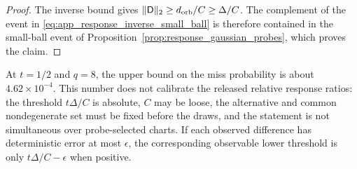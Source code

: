 \begin{proof}
The inverse bound gives $\|\mathsf D\|_2\ge d_{\rm orb}/C\ge\Delta/C$.
The complement of the event in
\eqref{eq:app_response_inverse_small_ball} is therefore contained in the
small-ball event of Proposition~\ref{prop:response_gaussian_probes}, which
proves the claim.
\end{proof}

At $t=1/2$ and $q=8$, the upper bound on the miss probability is about
$4.62\times10^{-4}$.  This number does not calibrate the released relative
response ratios: the threshold $t\Delta/C$ is absolute, $C$ may be loose,
the alternative and common nondegenerate set must be fixed before the draws,
and the statement is not simultaneous over probe-selected charts.  If each
observed difference has deterministic error at most $\epsilon$, the
corresponding observable lower threshold is only
$t\Delta/C-\epsilon$ when positive.

